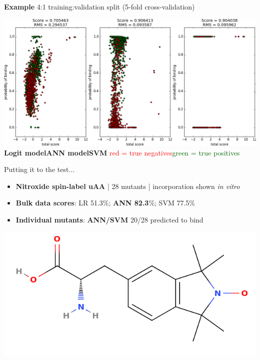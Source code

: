 \documentclass{beamer}
\begin{document}
\begin{frame}
    \textbf{Example} 4:1 training:validation split (5-fold cross-validation)
    \begin{center}
    \includegraphics[width=\linewidth]{1-5split-classification.png}\\
    \hfill\textbf{Logit model}\hfill\textbf{ANN model}\hfill\textbf{SVM}\hfill\quad
    \newline
    \textcolor{red}{red = true negatives}\quad\textcolor{darkgreen}{green = true positives}
    \newline\newline\newline
    \end{center}
\end{frame}

\begin{frame}{Putting it to the test...}
\begin{itemize}
    \item \textbf{Nitroxide spin-label uAA} | 28 mutants | incorporation shown \textit{in vitro}
    \item \textbf{Bulk data scores}: LR 51.3\%; \textbf{ANN 82.3}\%; SVM 77.5\%
    \item \textbf{Individual mutants}: \textbf{ANN/SVM} 20/28 predicted to bind
\end{itemize}
\begin{center}
    \includegraphics[scale = 0.2]{EPR.png}
\end{center}
\end{frame}
\end{document}
